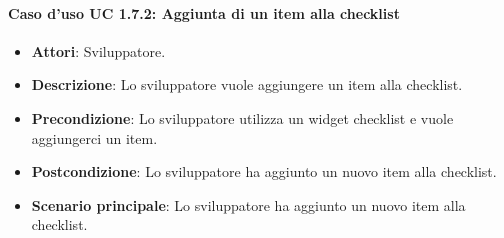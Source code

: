 \paragraph{Caso d'uso UC 1.7.2: Aggiunta di un item alla checklist}
\label{UC 1.7.2: Aggiunta di un item alla checklist}

\FloatBarrier
\begin{itemize}
\item\textbf{Attori}: Sviluppatore.
\item\textbf{Descrizione}: Lo sviluppatore vuole aggiungere un item alla checklist.
\item\textbf{Precondizione}: Lo sviluppatore utilizza un widget checklist e vuole aggiungerci un item.
\item\textbf{Postcondizione}: Lo sviluppatore ha aggiunto un nuovo item alla checklist.
\item\textbf{Scenario principale}: Lo sviluppatore ha aggiunto un nuovo item alla checklist.
\end{itemize}